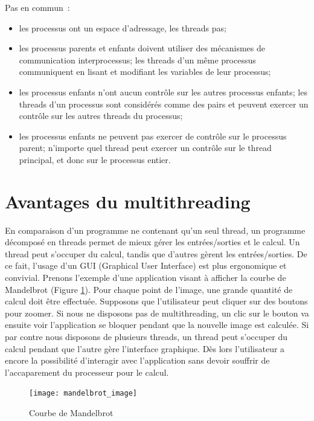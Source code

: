 Pas en commun~:
\begin{itemize}
  \item les processus ont un espace d'adressage, les threads pas;
  \item les processus parents et enfants doivent utiliser des mécanismes de communication interprocessus; les threads d'un même processus communiquent en lisant et modifiant les variables de leur processus;
  \item les processus enfants n'ont aucun contrôle sur les autres processus enfants; les threads d'un processus sont considérés comme des pairs et peuvent exercer un contrôle sur les autres threads du processus;
  \item les processus enfants ne peuvent pas exercer de contrôle sur le processus parent; n'importe quel thread peut exercer un contrôle sur le thread principal, et donc sur le processus entier.
\end{itemize}


\section{Avantages du multithreading}

En comparaison d'un programme ne contenant qu'un seul thread, un programme décomposé en threads permet de mieux gérer les entrées/sorties et le calcul. Un thread peut s'occuper du calcul, tandis que d'autres gèrent les entrées/sorties. De ce fait, l'usage d'un GUI (Graphical User Interface) est plus ergonomique et convivial. Prenons l'exemple d'une application visant à afficher la courbe de Mandelbrot (Figure \ref{fig:mandelbrot}). Pour chaque point de l'image, une grande quantité de calcul doit être effectuée. Supposons que l'utilisateur peut cliquer sur des boutons pour zoomer. Si nous ne disposons pas de multithreading, un clic sur le bouton va ensuite voir l'application se bloquer pendant que la nouvelle image est calculée. Si par contre nous disposons de plusieurs threads, un thread peut s'occuper du calcul pendant que l'autre gère l'interface graphique. Dès lors l'utilisateur a encore la possibilité d'interagir avec l'application sans devoir souffrir de l'accaparement du processeur pour le calcul.

\begin{figure}[ht]
  \centering
  \texttt{[image: mandelbrot\_image]}
  \caption{\label{fig:mandelbrot}Courbe de Mandelbrot}

\end{figure}

